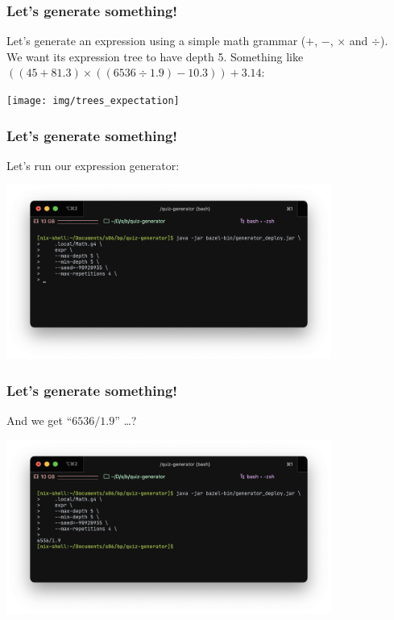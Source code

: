 \documentclass[t,aspectratio=1610]{beamer}
\newcommand{\lp}{\left(}
\newcommand{\rp}{\right)}
\begin{document}
\begin{frame}
\frametitle{Let's generate something!}
Let's generate an expression using a simple math grammar
($ + $, $ - $, $ \times $ and $ \div $).\\
We want its expression tree to have depth 5. \medbreak
Something like
$ \lp \lp 45 + 81.3 \rp \times \lp \lp 6536 \div 1.9 \rp - 10.3 \rp \rp + 3.14 $: \\
\begin{center}
	\texttt{[image: img/trees\_expectation]}
\end{center}
\end{frame}

\begin{frame}
\frametitle{Let's generate something!}
Let's run our expression generator:
\begin{center}
	\includegraphics[width=0.8\textwidth]{img/trees_example_0}	
\end{center}
\end{frame}

\begin{frame}
\frametitle{Let's generate something!}
And we get ``$ 6536 / 1.9 $'' \dots?
\begin{center}
	\includegraphics[width=0.8\textwidth]{img/trees_example_1}	
\end{center}
\end{frame}
\end{document}
